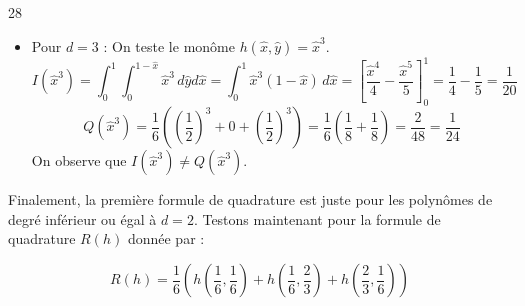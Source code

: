 \begin{reponse}{28}
\begin{itemize}
\begin{itemize}
\[                Q(\hat{x}\hat{y}) = \frac{1}{6}\left(\frac{1}{2} \times 0 + 0 \times \frac{1}{2} + \frac{1}{2} \times \frac{1}{2}\right) = \frac{1}{6} \times \frac{1}{4} = \frac{1}{24}
            \]    
        \end{itemize}
        La formule est donc également exacte pour le degré $2$. \\
        \item Pour $d=3$ :
        On teste le monôme $h(\hat{x}, \hat{y}) = \hat{x}^3$.
        \[
            I(\hat{x}^3) = \int_0^1 \int_0^{1-\hat{x}} \hat{x}^3 \, d\hat{y}d\hat{x} = \int_0^1 \hat{x}^3(1-\hat{x}) \, d\hat{x} = \left[ \frac{\hat{x}^4}{4} - \frac{\hat{x}^5}{5} \right]_0^1 = \frac{1}{4} - \frac{1}{5} = \frac{1}{20}
        \]
        \[
            Q(\hat{x}^3) = \frac{1}{6} \left( \left(\frac{1}{2}\right)^3 + 0 + \left(\frac{1}{2}\right)^3 \right) = \frac{1}{6} \left( \frac{1}{8} + \frac{1}{8} \right) = \frac{2}{48} = \frac{1}{24}
        \]
        On observe que $I(\hat{x}^3) \neq Q(\hat{x}^3)$.
    \end{itemize} 

    \vspace{0.8em}
    
    Finalement, la première formule de quadrature est juste pour les polynômes de degré inférieur ou égal à $d=2$. Testons maintenant pour la formule de quadrature $R(h)$ donnée par :
    
    \[
        R(h) = \frac{1}{6} \left( h \left( \frac{1}{6}, \frac{1}{6}\right) + h \left(\frac{1}{6}, \frac{2}{3}\right)+ h \left( \frac{2}{3}, \frac{1}{6}\right)\right)
    \]
    

\end{reponse}
